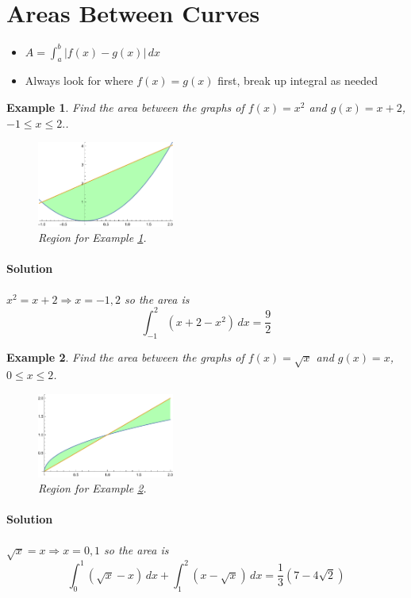 \documentclass[letterpaper, 11pt, openany]{book}
\theoremstyle{mytheoremstyle}
\theoremstyle{myexamplestyle}
\newtheorem{example}{Example}[section]
\newenvironment{solution}{\paragraph{\sffamily \smaller \fontseries{b}\selectfont Solution}}{\hfill\faSquare}
\begin{document}
\section{Areas Between Curves}
\setcounter{figure}{0}

\begin{itemize}
    \item $\displaystyle A = \int_{a}^{b} \left| f(x) - g(x)\right|\, dx$
    \item Always look for where $f(x) = g(x)$ first, break up integral as needed
\end{itemize}

\begin{example}
    \label{e:arealineparabola} Find the area between the graphs of $f(x) = x^{2}$ and $g(x) = x + 2$, \(-1 \leq x \leq 2.\).
    \begin{figure}[htbp]
        \centering
            \includegraphics[width=0.4\textwidth]{Figures/arealineparabola.pdf}
        \caption{Region for Example \ref{e:arealineparabola}.}
        \label{f:arealineparabola}
    \end{figure}

    \begin{solution}
        $x^{2} = x + 2 \Rightarrow x = -1,2$ so the area is
        \[\int_{-1}^{2} \left( x + 2 - x^{2} \right)\, dx = \frac{9}{2}\]
    \end{solution}
\end{example}

\begin{example}
    \label{e:areasqrt} Find the area between the graphs of $f(x) = \sqrt{x}$ and $g(x) = x$, $0 \leq x \leq 2$.
    \begin{figure}[htbp]
        \centering
            \includegraphics[width=0.4\textwidth]{Figures/areasqrt.pdf}
        \caption{Region for Example \ref{e:areasqrt}.}
        \label{f:areasqrt}
    \end{figure}   
    
    \begin{solution}
        $\sqrt{x} = x \Rightarrow x = 0, 1$ so the area is
        \[\int_{0}^{1} \left( \sqrt{x} - x \right)\, dx + \int_{1}^{2} \left( x - \sqrt{x} \right) \, dx = \frac{1}{3}\left( 7 - 4\sqrt{2} \right)\]
    \end{solution}
\end{example}
\end{document}
